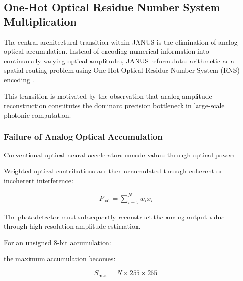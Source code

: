 \documentclass[journal]{IEEEtran}
\begin{document}

\subsection{\textbf{One-Hot Optical Residue Number System Multiplication}}

The central architectural transition within JANUS is the elimination of analog optical accumulation. Instead of encoding numerical information into continuously varying optical amplitudes, JANUS reformulates arithmetic as a spatial routing problem using One-Hot Optical Residue Number System (RNS) encoding \cite{Omosanya2021}\cite{Huang1979}\cite{Sorger2018}.

This transition is motivated by the observation that analog amplitude reconstruction constitutes the dominant precision bottleneck in large-scale photonic computation.

\subsubsection{\textbf{Failure of Analog Optical Accumulation}}

Conventional optical neural accelerators encode values through optical power:

\begin{center}
\label{eq:analog_encoding}
\end{center}

Weighted optical contributions are then accumulated through coherent or incoherent interference:

\begin{align}
P_{\mathrm{out}} = \sum_{i=1}^{N} w_i x_i
\label{eq:analog_mac}
\end{align}

The photodetector must subsequently reconstruct the analog output value through high-resolution amplitude estimation.

For an unsigned 8-bit accumulation:

\begin{center}
\end{center}

the maximum accumulation becomes:

\begin{equation}
S_{\max} = N \times 255 \times 255
\end{equation}
\end{document}
